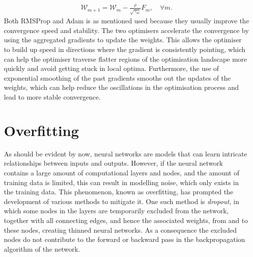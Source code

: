 \begin{align}\label{Eq:Adam_updatew}
    \mathcal{W}_{m+1} = \mathcal{W}_{m} - \frac{\rho}{\sqrt{\gamma_m}}F_m,\quad\forall m.
\end{align} 
Both RMSProp and Adam is as mentioned used because they usually improve the convergence speed and stability. The two optimisers accelerate the convergence by using the aggregated gradients to update the weights. This allows the optimiser to build up speed in directions where the gradient is consistently pointing, which can help the optimiser traverse flatter regions of the optimisation landscape more quickly and avoid getting stuck in local optima. Furthermore, the use of exponential smoothing of the past gradients smooths out the updates of the weights, which can help reduce the oscillations in the optimisation process and lead to more stable convergence.


\section{Overfitting}
As should be evident by now, neural networks are models that can learn intricate relationships between inputs and outputs. However, if the neural network contains a large amount of computational layers and nodes, and the amount of training data is limited, this can result in modelling noise, which only exists in the training data. This phenomenon, known as overfitting, has prompted the development of various methods to mitigate it. One such method is \emph{dropout}, in which some nodes in the layers are temporarily excluded from the network, together with all connecting edges, and hence the associated weights, from and to these nodes, creating thinned neural networks. As a consequence the excluded nodes do not contribute to the forward or backward pass in the backpropagation algorithm of the network. 

